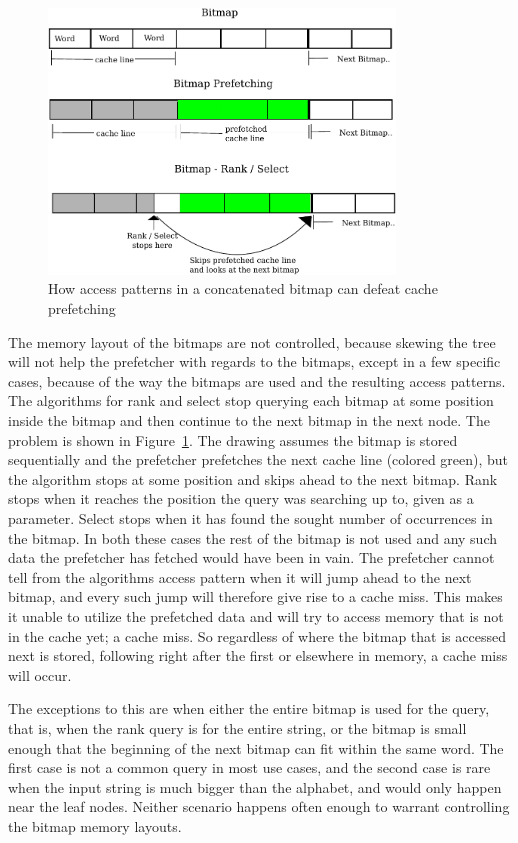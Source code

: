 \begin{figure}\tiny\center
\includegraphics[width=0.82\textwidth]{QueryPrefetchFigure.pdf}
\caption{How access patterns in a concatenated bitmap can defeat cache prefetching}
\label{fig:QueryPrefetchFigure}
\end{figure}

The memory layout of the bitmaps are not controlled, because skewing the tree will not help the prefetcher with regards to the bitmaps, except in a few specific cases, because of the way the bitmaps are used and the resulting access patterns.
The algorithms for rank and select stop querying each bitmap at some position inside the bitmap and then continue to the next bitmap in the next node.
The problem is shown in Figure~\ref{fig:QueryPrefetchFigure}. The drawing assumes the bitmap is stored sequentially and the prefetcher prefetches the next cache line (colored green), but the algorithm stops at some position and skips ahead to the next bitmap. 
Rank stops when it reaches the position the query was searching up to, given as a parameter.
Select stops when it has found the sought number of occurrences in the bitmap.
In both these cases the rest of the bitmap is not used and any such data the prefetcher has fetched would have been in vain.
The prefetcher cannot tell from the algorithms access pattern when it will jump ahead to the next bitmap, and every such jump will therefore give rise to a cache miss.
This makes it unable to utilize the prefetched data and will try to access memory that is not in the cache yet; a cache miss.
So regardless of where the bitmap that is accessed next is stored, following right after the first or elsewhere in memory, a cache miss will occur.

The exceptions to this are when either the entire bitmap is used for the query, that is, when the rank query is for the entire string, or the bitmap is small enough that the beginning of the next bitmap can fit within the same word.
The first case is not a common query in most use cases, and the second case is rare when the input string is much bigger than the alphabet, and would only happen near the leaf nodes.
Neither scenario happens often enough to warrant controlling the bitmap memory layouts.





